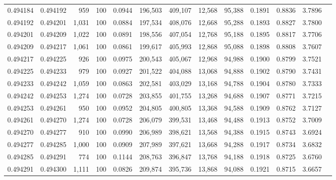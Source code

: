 \begin{tabular}{rrrrrrrrrrrrr}
0.494184 & 0.494192 &   959 & 100 &                                     0.0944 & 196,503 & 409,107 &  12,568 &  95,388 & 0.1891 & 0.8836 & 3.7896 \\
0.494192 & 0.494201 & 1,031 & 100 &                                     0.0884 & 197,534 & 408,076 &  12,668 &  95,288 & 0.1893 & 0.8827 & 3.7800 \\
0.494201 & 0.494209 & 1,022 & 100 &                                     0.0891 & 198,556 & 407,054 &  12,768 &  95,188 & 0.1895 & 0.8817 & 3.7706 \\
0.494209 & 0.494217 & 1,061 & 100 &                                     0.0861 & 199,617 & 405,993 &  12,868 &  95,088 & 0.1898 & 0.8808 & 3.7607 \\
0.494217 & 0.494225 &   926 & 100 &                                     0.0975 & 200,543 & 405,067 &  12,968 &  94,988 & 0.1900 & 0.8799 & 3.7521 \\
0.494225 & 0.494233 &   979 & 100 &                                     0.0927 & 201,522 & 404,088 &  13,068 &  94,888 & 0.1902 & 0.8790 & 3.7431 \\
0.494233 & 0.494242 & 1,059 & 100 &                                     0.0863 & 202,581 & 403,029 &  13,168 &  94,788 & 0.1904 & 0.8780 & 3.7333 \\
0.494242 & 0.494253 & 1,274 & 100 &                                     0.0728 & 203,855 & 401,755 &  13,268 &  94,688 & 0.1907 & 0.8771 & 3.7215 \\
0.494253 & 0.494261 &   950 & 100 &                                     0.0952 & 204,805 & 400,805 &  13,368 &  94,588 & 0.1909 & 0.8762 & 3.7127 \\
0.494261 & 0.494270 & 1,274 & 100 &                                     0.0728 & 206,079 & 399,531 &  13,468 &  94,488 & 0.1913 & 0.8752 & 3.7009 \\
0.494270 & 0.494277 &   910 & 100 &                                     0.0990 & 206,989 & 398,621 &  13,568 &  94,388 & 0.1915 & 0.8743 & 3.6924 \\
0.494277 & 0.494285 & 1,000 & 100 &                                     0.0909 & 207,989 & 397,621 &  13,668 &  94,288 & 0.1917 & 0.8734 & 3.6832 \\
0.494285 & 0.494291 &   774 & 100 &                                     0.1144 & 208,763 & 396,847 &  13,768 &  94,188 & 0.1918 & 0.8725 & 3.6760 \\
0.494291 & 0.494300 & 1,111 & 100 &                                     0.0826 & 209,874 & 395,736 &  13,868 &  94,088 & 0.1921 & 0.8715 & 3.6657 \\

\end{tabular}
